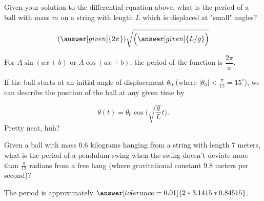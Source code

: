\documentclass[handout,nooutcomes]{ximera}
\begin{document}
\begin{example}
\begin{explanation}
\begin{question}
Given your solution to the differential equation above, what is the period of a ball with mass $m$ on a string with length $L$ which is displaced at "small" angles?

\[
(\answer[given]{2\pi})\sqrt{\Big(\answer[given]{L/g}\Big)}
\]
\begin{hint}
For $A\sin(ax+b)$ or $A\cos(ax+b)$, the period of the function is $\dfrac{2\pi}{a}$.
\end{hint}
\end{question}

If the ball starts at an initial angle of displacement $\theta_0$
(where $|\theta_0|<\frac{\pi}{12}= 15^\circ$), we can describe
the position of the ball at any given time by

\[
\theta(t) = \theta_0 \cos\Big(\sqrt{\frac{g}{L}} t\Big).
\]
Pretty neat, huh?

\begin{question}
Given a ball with mass $0.6$ kilograms hanging from a string with length $7$ meters, what is the period of a pendulum swing when the swing doesn't deviate more than $\frac{\pi}{12}$ radians from a free hang (where gravitational constant $9.8$ meters per second)?


The period is approximately $\answer[tolerance=0.01]{2*3.1415*0.84515}$.
\end{question}
\end{explanation}
\end{example}
\end{document}
